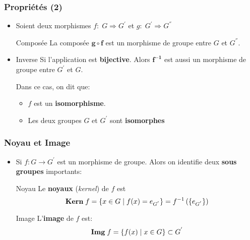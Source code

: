 \documentclass{beamer}
\begin{document}
\begin{frame}[t]
  \frametitle{Propriétés (2) }
  \begin{itemize}
    \small
  \item Soient deux morphismes $f:\;G\Longrightarrow G^{'}$ et $g:\;G^{'}\Longrightarrow G^{''}$
    \begin{block}{Composée}
         La composée \alert{$\mathbf{g\circ f}$ est un morphisme} de groupe entre $G$ et
   $G^{''}$.\\[8pt]
    \end{block}
    \pause
    \item 
      \begin{block}{Inverse}
   Si l'application est \textbf{\alert{bijective}}. Alors $\mathbf{f^{-1}}$ est aussi un morphisme de
   groupe entre $G^{'}$ et $G$.\\[8pt]
    \end{block}

   Dans ce cas, on dit que:
   \begin{itemize}
     \item $f$ est un \textbf{\alert{isomorphisme}}.\\[8pt]
     \item Les deux groupes $G$ et $G^{'}$ sont \textbf{\alert{isomorphes}}
   \end{itemize}
 \end{itemize}
\end{frame}

\begin{frame}[t]
  \frametitle{Noyau et Image}
  \begin{itemize}
    \small
    \item Si $f: G\longrightarrow G^{'}$ est un morphisme de groupe. Alors on
      identifie deux \textbf{sous groupes} importants:

      \begin{block}{Noyau}
        \small
        Le \textbf{\alert{noyaux}} (\emph{kernel}) de $f$ est
        \begin{equation}
          \text{\textbf{Kern}}\;f = \left\{ x\in G\;|\; f(x) = e_{G^{'}}\right\}
          = f^{-1}\left(\left\{ e_{G^{'}}\right\}\right)
        \end{equation}
      \end{block}
      \pause
      \vspace*{1cm}
      \begin{block}{Image}
        \small L'\alert{\textbf{image}} de $f$ est:
        \begin{equation}
          \text{\textbf{Img}}\;f = \left\{ f(x)\;|\; x\in G\right\}\subset G^{'}
        \end{equation}
      \end{block}
  \end{itemize}
\end{frame}
\end{document}
